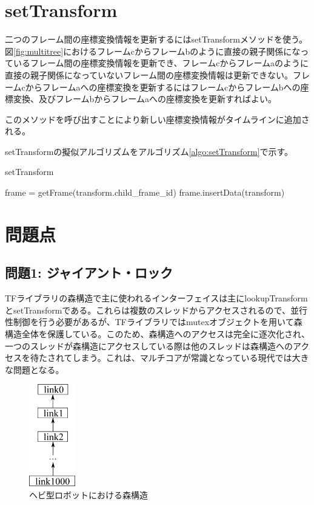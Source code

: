 \documentclass[a4paper]{jreport}	%
\begin{document}
\section{setTransform}
二つのフレーム間の座標変換情報を更新するにはsetTransformメソッドを使う。図\ref{fig:multitree}におけるフレームcからフレームbのように直接の親子関係になっているフレーム間の座標変換情報を更新でき、フレームcからフレームaのように直接の親子関係になっていないフレーム間の座標変換情報は更新できない。フレームcからフレームaへの座標変換を更新するにはフレームcからフレームbへの座標変換、及びフレームbからフレームaへの座標変換を更新すればよい。

このメソッドを呼び出すことにより新しい座標変換情報がタイムラインに追加される。

setTransformの擬似アルゴリズムをアルゴリズム\ref{algo:setTransform}で示す。


\begin{algorithm}
\caption{setTransform}\label{algo:setTransform}
\begin{algorithmic}[1]
	 
	\State frame = getFrame(transform.child\_frame\_id)
	\State frame.insertData(transform)
	\EndProcedure
\end{algorithmic}
\end{algorithm}

\section{問題点}
\subsection*{問題1: ジャイアント・ロック}
TFライブラリの森構造で主に使われるインターフェイスは主にlookupTransformとsetTransformである。これらは複数のスレッドからアクセスされるので、並行性制御を行う必要があるが、TFライブラリではmutexオブジェクトを用いて森構造全体を保護している。このため、森構造へのアクセスは完全に逐次化され、一つのスレッドが森構造にアクセスしている際は他のスレッドは森構造へのアクセスを待たされてしまう。これは、マルチコアが常識となっている現代では大きな問題となる。

\begin{figure}[h] 
\centering
\includegraphics[width=2cm]{snake}	
\caption{ヘビ型ロボットにおける森構造}
\label{fig:snake}
\end{figure}
\end{document}
